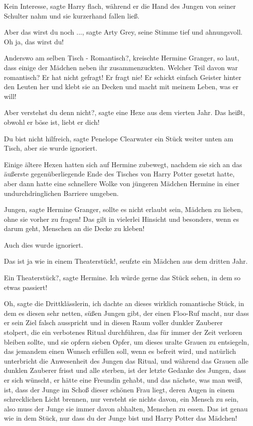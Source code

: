 \glqq{}Kein Interesse\grqq{}, sagte Harry flach, während er die Hand des Jungen
von seiner Schulter nahm und sie kurzerhand fallen ließ.

\glqq{}Aber das wirst du noch ...\grqq{}, sagte Arty Grey, seine Stimme tief und
ahnungsvoll. \glqq{}Oh ja, das wirst du!\grqq{}

Anderswo am selben Tisch - \glqq{}Romantisch?\grqq{}, kreischte Hermine Granger,
so laut, dass einige der Mädchen neben ihr zusammenzuckten. \glqq{}Welcher Teil
davon war romantisch? Er hat nicht gefragt! Er fragt nie! Er schickt einfach
Geister hinter den Leuten her und klebt sie an Decken und macht mit meinem
Leben, was er will!\grqq{}

\glqq{}Aber verstehst du denn nicht?\grqq{}, sagte eine Hexe aus dem vierten
Jahr. \glqq{}Das heißt, obwohl er böse ist, liebt er dich!\grqq{}

\glqq{}Du bist nicht hilfreich\grqq{}, sagte Penelope Clearwater ein Stück weiter
unten am Tisch, aber sie wurde ignoriert.

Einige ältere Hexen hatten sich auf Hermine zubewegt, nachdem sie sich an das
äußerste gegenüberliegende Ende des Tisches von Harry Potter gesetzt hatte, aber
dann hatte eine schnellere Wolke von jüngeren Mädchen Hermine in einer
undurchdringlichen Barriere umgeben.

\glqq{}Jungen\grqq{}, sagte Hermine Granger, \glqq{}sollte es nicht erlaubt sein,
Mädchen zu lieben, ohne sie vorher zu fragen! Das gilt in vielerlei Hinsicht und
besonders, wenn es darum geht, Menschen an die Decke zu kleben!\grqq{}

Auch dies wurde ignoriert.

\glqq{}Das ist ja wie in einem Theaterstück!\grqq{}, seufzte ein Mädchen aus dem
dritten Jahr.

\glqq{}Ein Theaterstück?\grqq{}, sagte Hermine. \glqq{}Ich würde gerne das Stück
sehen, in dem so etwas passiert!\grqq{}

\glqq{}Oh\grqq{}, sagte die Drittklässlerin, \glqq{}ich dachte an dieses wirklich
romantische Stück, in dem es diesen sehr netten, süßen Jungen gibt, der einen
Floo-Ruf macht, nur dass er sein Ziel falsch ausspricht und in diesen Raum
voller dunkler Zauberer stolpert, die ein verbotenes Ritual durchführen, das für
immer der Zeit verloren bleiben sollte, und sie opfern sieben Opfer, um dieses
uralte Grauen zu entsiegeln, das jemandem einen Wunsch erfüllen soll, wenn es
befreit wird, und natürlich unterbricht die Anwesenheit des Jungen das Ritual,
und während das Grauen alle dunklen Zauberer frisst und alle sterben, ist der
letzte Gedanke des Jungen, dass er sich wünscht, er hätte eine Freundin gehabt,
und das nächste, was man weiß, ist, dass der Junge im Schoß dieser schönen Frau
liegt, deren Augen in einem schrecklichen Licht brennen, nur versteht sie nichts
davon, ein Mensch zu sein, also muss der Junge sie immer davon abhalten,
Menschen zu essen. Das ist genau wie in dem Stück, nur dass du der Junge bist
und Harry Potter das Mädchen!\grqq{}

